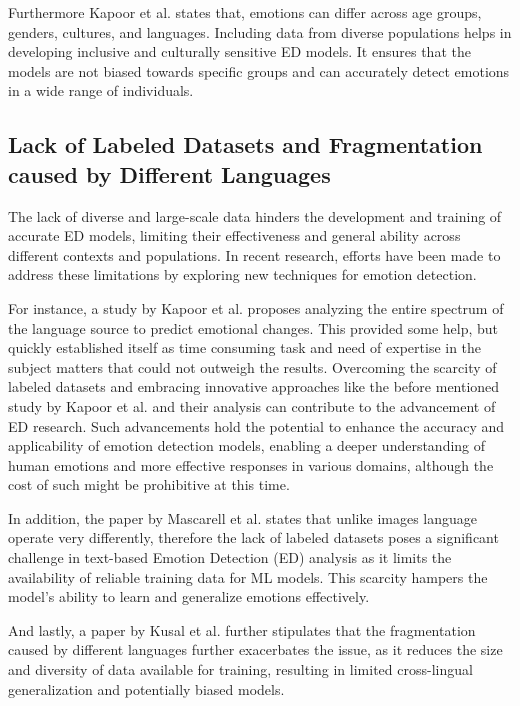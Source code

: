 \documentclass[11pt]{article}
\begin{document}
Furthermore Kapoor et al. \cite{KAPOOR2023120882} states that, emotions can differ across age groups, genders, cultures, and languages. Including data from diverse populations helps in developing inclusive and culturally sensitive ED models. It ensures that the models are not biased towards specific groups and can accurately detect emotions in a wide range of individuals.

\subsection{Lack of Labeled Datasets and Fragmentation caused by Different Languages}
The lack of diverse and large-scale data hinders the development and training of accurate ED models, limiting their effectiveness and general ability across different contexts and populations. In recent research, efforts have been made to address these limitations by exploring new techniques for emotion detection.

For instance, a study by Kapoor\cite{KAPOOR2023120882} et al. proposes analyzing the entire spectrum of the language source to predict emotional changes. This provided some help, but quickly established itself as time consuming task and need of expertise in the subject matters that could not outweigh the results. Overcoming the scarcity of labeled datasets and embracing innovative approaches like the before mentioned study by Kapoor\cite{KAPOOR2023120882} et al. and their analysis can contribute to the advancement of ED research. Such advancements hold the potential to enhance the accuracy and applicability of emotion detection models, enabling a deeper understanding of human emotions and more effective responses in various domains, although the cost of such might be prohibitive at this time.

In addition, the paper by Mascarell\cite{mascarell-etal-2021-stance} et al. states that unlike images language operate very differently, therefore the lack of labeled datasets poses a significant challenge in text-based Emotion Detection (ED) analysis as it limits the availability of reliable training data for ML models. This scarcity hampers the model's ability to learn and generalize emotions effectively.

And lastly, a paper by Kusal et al. further stipulates \cite{kusal} that the fragmentation caused by different languages further exacerbates the issue, as it reduces the size and diversity of data available for training, resulting in limited cross-lingual generalization and potentially biased models.
\end{document}
